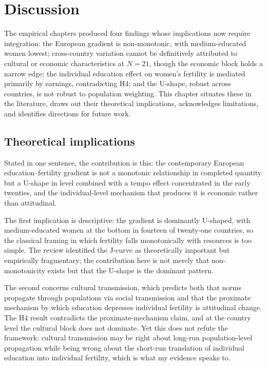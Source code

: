 \documentclass[12pt,a4paper]{report}
\begin{document}
\chapter{Discussion}

The empirical chapters produced four findings whose implications now require integration: the
European gradient is non-monotonic, with medium-educated women lowest; cross-country variation cannot
be definitively attributed to cultural or economic characteristics at $N=21$, though the economic
block holds a narrow edge; the individual education effect on women's fertility is mediated primarily
by earnings, contradicting H4; and the U-shape, robust across countries, is not robust to population
weighting. This chapter situates these in the literature, draws out their theoretical implications,
acknowledges limitations, and identifies directions for future work.

\section{Theoretical implications}
Stated in one sentence, the contribution is this: the contemporary European education--fertility
gradient is not a monotonic relationship in completed quantity but a U-shape in level combined with a
tempo effect concentrated in the early twenties, and the individual-level mechanism that produces it is
economic rather than attitudinal.

The first implication is descriptive: the gradient is dominantly U-shaped, with medium-educated women
at the bottom in fourteen of twenty-one countries, so the classical framing in which fertility falls
monotonically with resources is too simple. The \citet{stulpbarrett2016} review identified the J-curve as
theoretically important but empirically fragmentary; the contribution here is not merely that
non-monotonicity exists but that the U-shape is the dominant pattern.

The second concerns cultural transmission, which predicts both that norms
propagate through populations via social transmission and that the proximate mechanism by which
education depresses individual fertility is attitudinal change. The H4 result contradicts the
proximate-mechanism claim, and at the country level the cultural block does not dominate. Yet this does
not refute the framework: cultural transmission may be right about long-run population-level
propagation while being wrong about the short-run translation of individual education into individual
fertility, which is what my evidence speaks to.
\end{document}
